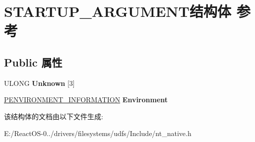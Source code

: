 \hypertarget{struct_s_t_a_r_t_u_p___a_r_g_u_m_e_n_t}{}\section{S\+T\+A\+R\+T\+U\+P\+\_\+\+A\+R\+G\+U\+M\+E\+N\+T结构体 参考}
\label{struct_s_t_a_r_t_u_p___a_r_g_u_m_e_n_t}
\subsection*{Public 属性}
\begin{DoxyCompactItemize}
\item 
\mbox{\label{struct_s_t_a_r_t_u_p___a_r_g_u_m_e_n_t_aa3f99b0b531375e1e33422eb45309905}} 
U\+L\+O\+NG {\bfseries Unknown} \mbox{[}3\mbox{]}
\item 
\mbox{\label{struct_s_t_a_r_t_u_p___a_r_g_u_m_e_n_t_ad85dd1c3ec61c985c58a7f942953e877}} 
\hyperlink{struct_e_n_v_i_r_o_n_m_e_n_t___i_n_f_o_r_m_a_t_i_o_n}{P\+E\+N\+V\+I\+R\+O\+N\+M\+E\+N\+T\+\_\+\+I\+N\+F\+O\+R\+M\+A\+T\+I\+ON} {\bfseries Environment}
\end{DoxyCompactItemize}


该结构体的文档由以下文件生成\+:\begin{DoxyCompactItemize}
\item 
E\+:/\+React\+O\+S-\/0../drivers/filesystems/udfs/\+Include/nt\+\_\+native.\+h\end{DoxyCompactItemize}
